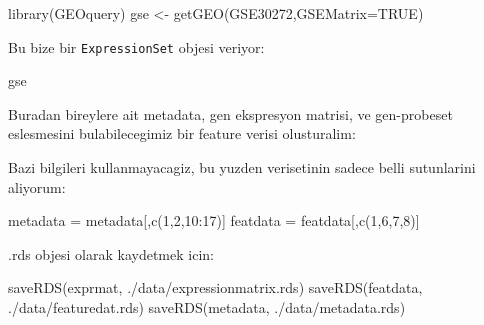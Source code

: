 \documentclass[
]{book}
\newenvironment{Shaded}{\begin{snugshade}}{\end{snugshade}}
\newcommand{\AttributeTok}[1]{\textcolor[rgb]{0.77,0.63,0.00}{#1}}
\newcommand{\ConstantTok}[1]{\textcolor[rgb]{0.00,0.00,0.00}{#1}}
\newcommand{\DecValTok}[1]{\textcolor[rgb]{0.00,0.00,0.81}{#1}}
\newcommand{\FunctionTok}[1]{\textcolor[rgb]{0.00,0.00,0.00}{#1}}
\newcommand{\NormalTok}[1]{#1}
\newcommand{\OtherTok}[1]{\textcolor[rgb]{0.56,0.35,0.01}{#1}}
\newcommand{\SpecialCharTok}[1]{\textcolor[rgb]{0.00,0.00,0.00}{#1}}
\newcommand{\StringTok}[1]{\textcolor[rgb]{0.31,0.60,0.02}{#1}}
\begin{document}
\begin{Shaded}
\begin{Highlighting}[]
\FunctionTok{library}\NormalTok{(GEOquery)}
\NormalTok{gse }\OtherTok{\textless{}{-}} \FunctionTok{getGEO}\NormalTok{(}\StringTok{\textquotesingle{}GSE30272\textquotesingle{}}\NormalTok{,}\AttributeTok{GSEMatrix=}\ConstantTok{TRUE}\NormalTok{)}
\end{Highlighting}
\end{Shaded}

Bu bize bir \texttt{ExpressionSet} objesi veriyor:

\begin{Shaded}
\begin{Highlighting}[]
\NormalTok{gse}
\end{Highlighting}
\end{Shaded}

Buradan bireylere ait metadata, gen ekspresyon matrisi, ve gen-probeset eslesmesini bulabilecegimiz bir feature verisi olusturalim:

\begin{Shaded}
\end{Shaded}

Bazi bilgileri kullanmayacagiz, bu yuzden verisetinin sadece belli sutunlarini aliyorum:

\begin{Shaded}
\begin{Highlighting}[]
\NormalTok{metadata }\OtherTok{=}\NormalTok{ metadata[,}\FunctionTok{c}\NormalTok{(}\DecValTok{1}\NormalTok{,}\DecValTok{2}\NormalTok{,}\DecValTok{10}\SpecialCharTok{:}\DecValTok{17}\NormalTok{)]}
\NormalTok{featdata }\OtherTok{=}\NormalTok{ featdata[,}\FunctionTok{c}\NormalTok{(}\DecValTok{1}\NormalTok{,}\DecValTok{6}\NormalTok{,}\DecValTok{7}\NormalTok{,}\DecValTok{8}\NormalTok{)]}
\end{Highlighting}
\end{Shaded}

.rds objesi olarak kaydetmek icin:

\begin{Shaded}
\begin{Highlighting}[]
\FunctionTok{saveRDS}\NormalTok{(exprmat, }\StringTok{\textquotesingle{}./data/expressionmatrix.rds\textquotesingle{}}\NormalTok{)}
\FunctionTok{saveRDS}\NormalTok{(featdata, }\StringTok{\textquotesingle{}./data/featuredat.rds\textquotesingle{}}\NormalTok{)}
\FunctionTok{saveRDS}\NormalTok{(metadata, }\StringTok{\textquotesingle{}./data/metadata.rds\textquotesingle{}}\NormalTok{)}
\end{Highlighting}
\end{Shaded}
\end{document}
